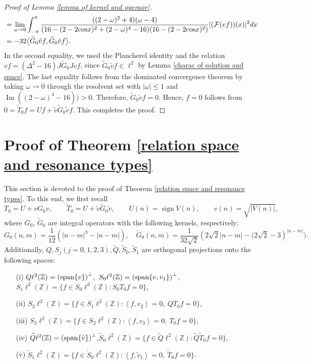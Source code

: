 \documentclass[reqno, 11pt]{amsart}
\newcommand\Z{\mathbb{Z}}
\newcommand\mcaF{\mathcal{F}}
\numberwithin{equation}{section}
\begin{document}
\begin{proof}[Proof of Lemma {\ref{lemma of kernel and operaor}}]
\begin{align*}
&=\lim\limits_{\omega\rightarrow0}\int_{-\pi}^{\pi}\frac{((2-\omega)^2+4)(\omega-4)}{(16-(2-2{\rm cos}x)^2+(2-\omega)^4-16)(16-(2-2{\rm cos}x)^2)}|(\mcaF (vf))(x)|^2dx\\
&=-32\big<\widetilde{G}_0\tilde{v}f,\widetilde{G}_0\tilde{v}f\big>.
\end{align*}
In the second equality, we used the Plancherel identity and the relation $vf=(\Delta^2-16)J\widetilde{G}_0Jvf$, since $\widetilde{G}_0\tilde{v}f\in\ell^2$ by Lemma \ref{charac of solution and space}. The last equality follows from the dominated convergence theorem by taking $\omega\to0$ through the resolvent set with $|\omega|\leq1$ and $\operatorname{Im}((2-\omega)^4-16))>0$. Therefore, $\widetilde{G}_0\tilde{v}f=0$. Hence, $f=0$ follows from  $0=\widetilde{T}_0f=Uf+\tilde{v}\widetilde{G}_0\tilde{v}f$. This completes the proof.
\end{proof}

\section{Proof of Theorem \ref{relation space and resonance types}}\label{proof of relation space and resonance types}
This section is devoted to the proof of Theorem \ref{relation space and resonance types}. To this end, we first recall 
$$T_{0}=U+vG_{0}v,\qquad\widetilde{T}_{0}=U+\tilde{v}\widetilde{G}_{0}\tilde{v},\qquad U(n)=\operatorname{sign}V(n),\qquad v(n)=\sqrt{|V(n)|},$$
where $G_0$, $\widetilde{G}_0$ are integral operators with the following kernels, respectively:
\begin{equation*}
G_0(n,m)=\frac{1}{12}\left(|n-m|^3-|n-m|\right),\quad
\widetilde{G}_0(n,m)=\frac{1}{32\sqrt2}\left(2\sqrt2 |n-m|-\Big(2\sqrt2-3\right)^{|n-m|}\Big).
\end{equation*}
Additionally, $Q,S_j(j=0,1,2,3),\widetilde{Q},\widetilde{S}_0,\widetilde{S}_1$ %
are orthogonal projections onto the following spaces:
\begin{itemize}
\item[(i)]$Q\ell^2(\Z)=\left({\rm span}\{v\}\right)^{\bot}$,\ $S_0\ell^2(\Z)=\left({\rm span}\{v,v_1\}\right)^{\bot}$,\  $S_1\ell^2(\Z)=\big\{f\in S_0\ell^2(\Z): S_0T_0f=0\big\}$,
    \vskip0.15cm
\item[(ii)]$S_2\ell^2(\Z)=\big\{f\in S_1\ell^2(\Z):\left<f,v_{2}\right>=0,\ QT_0f=0\big\}$,
\vskip0.15cm
\item[(iii)] $S_3\ell^2(\Z)=\big\{f\in S_2\ell^2(\Z):\left<f,v_{3}\right>=0,\ T_0f=0\big\}$,
\vskip0.15cm
\item[(iv)] $\widetilde{Q}\ell^2(\Z)=\left({\rm span}\{\tilde{v}\}\right)^{\bot}$,\quad $\widetilde{S}_0\ell^2(\Z)=\big\{f\in \widetilde{Q}\ell^2(\Z): \widetilde{Q}\widetilde{T}_0f=0\big\}$,
\vskip0.15cm
\item[(v)] $\widetilde{S}_1\ell^2(\Z)=\big\{f\in \widetilde{S}_0\ell^2(\Z):\left<f,\tilde{v}_1\right>=0,\ \widetilde{T}_0f=0\big\}$.
\end{itemize}
\end{document}
